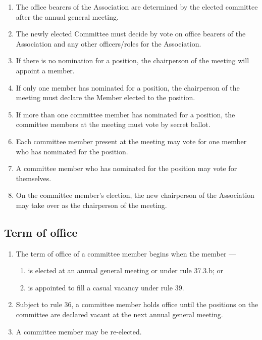 \documentclass[../constitution.tex]{subfiles}
\begin{document}
\begin{enumerate}

\item The office bearers of the Association are determined by the elected committee after the annual general meeting.
\item The newly elected Committee must decide by vote on office bearers of the Association and any other officers/roles for the Association.
\item If there is no nomination for a position, the chairperson of the meeting will appoint a member.
\item If only one member has nominated for a position, the chairperson of the meeting must declare the Member elected to the position.
\item If more than one committee member has nominated for a position, the committee members at the meeting must vote by secret ballot.
\item Each committee member present at the meeting may vote for one member who has nominated for the position.
\item A committee member who has nominated for the position may vote for themselves.
\item On the committee member's election, the new chairperson of the Association may take over as the chairperson of the meeting.
\end{enumerate}

\hypertarget{term-of-office}{%
\subsection{Term of office}\label{term-of-office}}

\begin{enumerate}

\item The term of office of a committee member begins when the member ---

  \begin{enumerate}
  
  \item is elected at an annual general meeting or under rule 37.3.b; or
  \item is appointed to fill a casual vacancy under rule 39.
  \end{enumerate}
\item Subject to rule 36, a committee member holds office until the positions on the committee are declared vacant at the next annual general meeting.
\item A committee member may be re-elected.
\end{enumerate}
\end{document}
